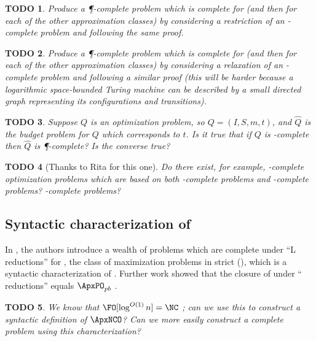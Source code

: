 \documentclass[]{article}
\theoremstyle{plain}
\newtheorem{todo}{TODO}
\theoremstyle{definition}
\begin{document}
\begin{todo}
  Produce a \P-complete problem which is complete for \ApxNCO{} (and then for each of the other approximation classes) by considering a restriction of an \NP-complete problem and following the same proof.
\end{todo}

\begin{todo}
  Produce a \P-complete problem which is complete for \ApxNCO{} (and then for each of the other approximation classes) by considering a relaxation of an \NL-complete problem and following a similar proof (this will be harder because a logarithmic space-bounded Turing machine can be described by a small directed graph representing its configurations and transitions).
\end{todo}

\begin{todo}
  Suppose $Q$ is an optimization problem, so $Q=(I, S, m, t)$, and $\hat{Q}$ is the budget problem for $Q$ which corresponds to $t$.
  Is it true that if $Q$ is \PO-complete then $\hat{Q}$ is \P-complete?
  Is the converse true?
\end{todo}

\begin{todo}[Thanks to Rita for this one]
  Do there exist, for example, \ApxPO-complete optimization problems which are based on both \NP-complete problems and \PSPACE-complete problems?
  \STP-complete problems?
\end{todo}

\subsection{Syntactic characterization of \texorpdfstring{\ApxNCO}{ApxNCO}}

In \cite{py91}, the authors introduce a wealth of problems which are complete under ``L reductions'' for \MaxSNP, the class of maximization problems in strict \NP{} (\SNP), which is a syntactic characterization of \NP.
Further work showed that the closure of \MaxSNP{} under ``\PTAS{} reductions'' equals $\ApxPO_{pb}$ \cite{kmsv99}.

\begin{todo}
  We know that $\FO[\log^{O(1)} n] = \NC$ \cite[Theorem~5.2]{immerman99}; can we use this to construct a syntactic definition of $\ApxNCO$?
  Can we more easily construct a complete problem using this characterization?
\end{todo}
\end{document}
